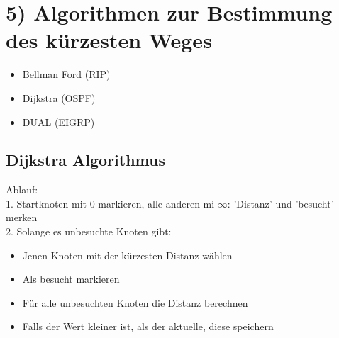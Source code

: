 \section*{5) Algorithmen zur Bestimmung des kürzesten Weges}
\begin{itemize}
	\item Bellman Ford (RIP)
	\item Dijkstra (OSPF)
	\item DUAL (EIGRP)
\end{itemize}

\subsection*{Dijkstra Algorithmus}
Ablauf: \\
1. Startknoten mit 0 markieren, alle anderen mi $\infty$: 'Distanz' und 'besucht' merken \\
2. Solange es unbesuchte Knoten gibt:
\begin{itemize}
	\item Jenen Knoten mit der kürzesten Distanz wählen
	\item Als besucht markieren
	\item Für alle unbesuchten Knoten die Distanz berechnen
	\item Falls der Wert kleiner ist, als der aktuelle, diese speichern
\end{itemize} 